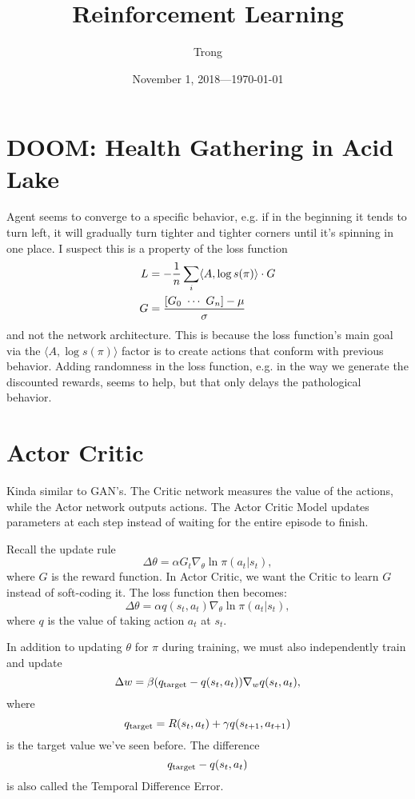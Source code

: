 \documentclass[12pt]{article}
\title{Reinforcement Learning}
\author{Trong}
\date{November 1, 2018---\today}
\theoremstyle{plain}
\theoremstyle{definition}
\theoremstyle{remark}
\renewcommand\frac[2]{\genfrac{}{}{0.5pt}{}{#1}{#2}}
\newcommand{\0}{\varnothing}
\renewcommand{\a}{\alpha}
\renewcommand{\b}{\beta}
\newcommand{\g}{\gamma}
\newcommand{\m}{\mu}
\newcommand{\s}{\sigma}
\renewcommand{\th}{\theta}
\newcommand{\D}{\Delta}
\newcommand{\<}{\langle}
\renewcommand{\>}{\rangle}
\begin{document}
\sloppy
\maketitle
\tableofcontents

\section{DOOM: Health Gathering in Acid Lake}

Agent seems to converge to a specific behavior, e.g. if in the beginning it tends to turn left, it will gradually turn tighter and tighter corners until it's spinning in one place. I suspect this is a property of the loss function
\begin{align*}
  L &= - \frac{1}{n} \sum_{i} \< A, \log s(\pi) \> \cdot G \\
  G &= \frac{[G_0 \ \cdots \ G_n] - \m}{\s}
\end{align*}
and not the network architecture. This is because the loss function's main goal via the \( \< A, \log s(\pi) \> \) factor is to create actions that conform with previous behavior. Adding randomness in the loss function, e.g. in the way we generate the discounted rewards, seems to help, but that only delays the pathological behavior.

\section{Actor Critic}

Kinda similar to GAN's. The Critic network measures the value of the actions, while the Actor network outputs actions. The Actor Critic Model updates parameters at each step instead of waiting for the entire episode to finish.

Recall the update rule
\[
\D \th = \a G_t \nabla_{\th} \ln \pi(a_t|s_t),
\]
where $ G $ is the reward function. In Actor Critic, we want the Critic to learn $ G $ instead of soft-coding it. The loss function then becomes: \[
\D \th = \a q(s_t, a_t) \nabla_{\th} \ln \pi(a_t|s_t),
\]
where $ q $ is the value of taking action $ a_t $ at $ s_t. $

In addition to updating $ \th $ for $ \pi $ during training, we must also independently train and update \[
\D w = \b (q_{\rm target} - q(s_t, a_t)) \nabla_{w} q(s_t, a_t),
\]
where \[
q_{\rm target} = R(s_t, a_t) + \g q(s_{t+1}, a_{t+1})
\]
is the target value we've seen before. The difference \[
q_{\rm target} - q(s_t, a_t)
\]
is also called the Temporal Difference Error.
\end{document}
